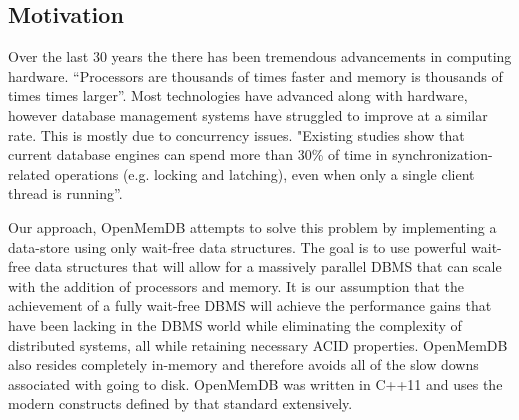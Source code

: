 \documentclass[letter,11pt]{article}
\begin{document}
\subsection{Motivation}
Over the last 30 years the there has been tremendous advancements in computing
hardware. ``Processors are thousands of times faster and memory is thousands of
times times larger''\cite{stonebraker2007end}. Most technologies have advanced 
along with hardware, however database management systems have struggled to improve
at a similar rate. This is mostly due to concurrency issues. "Existing studies show
that current database engines can spend more than 30\% of time in 
synchronization-related operations (e.g. locking and latching), even when only a 
single client thread is running''\cite{soares2015database}.
\par\vspace{\baselineskip}
Our approach, OpenMemDB attempts to solve this problem by implementing a data-store 
using only wait-free data structures. The goal is to use powerful wait-free data 
structures that will allow for a massively parallel DBMS that can scale with the 
addition of processors and memory. It is our assumption that the achievement of a 
fully wait-free DBMS will achieve the performance gains 
that have been lacking in the DBMS world while eliminating the complexity of 
distributed systems, all while retaining necessary ACID properties. OpenMemDB also
resides completely in-memory and therefore avoids all of the slow downs associated with
going to disk. OpenMemDB was written in C++11 and uses the modern constructs defined
by that standard extensively.
\par\vspace{\baselineskip}
\end{document}
